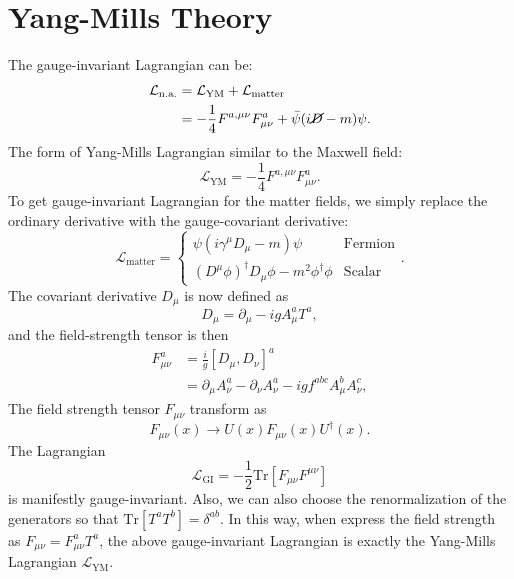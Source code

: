 \section{Yang-Mills Theory}
The gauge-invariant Lagrangian can be:
\begin{equation}
\begin{aligned}
	\mathcal L_{\mathrm{n.a.}} &= \mathcal L_{\mathrm{YM}} + \mathcal L_{\mathrm{matter}} \\
	&= -\frac{1}{4} F^{a,\mu\nu} F^a_{\mu\nu} + \bar\psi(i\cancel D-m)\psi.
\end{aligned}
\end{equation}
The form of Yang-Mills Lagrangian similar to the Maxwell field:
\begin{equation}
	\mathcal L_{\mathrm{YM}} = -\frac{1}{4} F^{a,\mu\nu} F^a_{\mu\nu}.
\end{equation}
To get gauge-invariant Lagrangian for the matter fields, we simply replace the ordinary derivative with the gauge-covariant derivative:
\begin{equation}
	\mathcal L_{\mathrm{matter}} = \begin{cases}
		\psi(i\gamma^\mu D_\mu - m)\psi & \text{Fermion} \\
		(D^\mu \phi)^\dagger D_\mu \phi - m^2 \phi^\dagger \phi & \text{Scalar}
	\end{cases}.
\end{equation}
The covariant derivative $D_\mu$ is now defined as
\begin{equation}
	D_\mu = \partial_\mu - i g A_\mu^a T^a,
\end{equation}
and the field-strength tensor is then
\begin{equation}
\begin{aligned}
	F^a_{\mu\nu} &= \frac{i}{g}[D_\mu, D_\nu]^a \\
	&= \partial_\mu A_\nu^a - \partial_\nu A_\nu^a -ig f^{abc} A^b_\mu A^c_\nu,
\end{aligned}
\end{equation}
The field strength tensor $F_{\mu\nu}$ transform as
\begin{equation}
	F_{\mu\nu}(x) \rightarrow U(x) F_{\mu\nu}(x) U^\dagger(x).
\end{equation}
The Lagrangian 
\begin{equation*}
	\mathcal L_{\mathrm{GI}} = -\frac{1}{2} \mathrm{Tr}\left[F_{\mu\nu} F^{\mu\nu}\right]
\end{equation*}
is manifestly gauge-invariant.
Also, we can also choose the renormalization of the generators so that $\mathrm{Tr}[T^aT^b] = \delta^{ab}$.
In this way, when express the field strength as $F_{\mu\nu} = F_{\mu\nu}^a T^a$, the above gauge-invariant Lagrangian is exactly the Yang-Mills Lagrangian $\mathcal L_{\mathrm{YM}}$.

